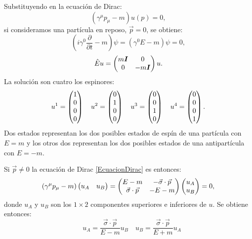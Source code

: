 \documentclass{article}
\theoremstyle{plain}
\theoremstyle{definition}
\begin{document}
	Substituyendo en la ecuación de Dirac:\[
	\left(\gamma^\mu p_{\mu}-m\right)u(p)=0,
	\]
	si consideramos una partícula en reposo, \(\vec{p}=0 \), se obtiene: \[\left(i\gamma^0\frac{\partial}{\partial t}-m\right)\psi=\left(\gamma^0E-m\right)\psi=0,\]
	\[\hat{E}u= \left(\begin{array}{@{}cc@{}}
	m\boldsymbol{I} & 0 \\
	0 & -m\boldsymbol{I}
	\end{array} \right)u \text{.}\]
	La solución son cuatro los espinores: \[
	u^1 =
	\left(\begin{array}{@{}c@{}}
	1 \\
	0 \\
	0 \\
	0
	\end{array} \right)
	\quad
	u^2 =
	\left(\begin{array}{@{}c@{}}
	0 \\
	1 \\
	0 \\
	0
	\end{array} \right)
	\quad
	u^3 =
	\left(\begin{array}{@{}c@{}}
	0 \\
	0 \\
	1 \\
	0
	\end{array} \right)
	\quad
	u^4 =
	\left(\begin{array}{@{}c@{}}
	0 \\
	0 \\
	0 \\
	1
	\end{array} \right)\text{.}
	\] Dos estados representan los dos posibles estados de espín de una partícula con \(E=m\) y los otros dos representan los dos posibles estados de una antipartícula con \(E=-m\).\par
	Si \(\vec{p}\neq 0 \) la ecuación de Dirac \ref{EcuacionDirac} es entonces: \[\left(\gamma^\mu p_\mu-m\right)\left(\begin{array}{@{}cc@{}}
	u_A & u_B
	\end{array} \right)= \left(\begin{array}{@{}cc@{}}
	E-m & -\vec{\sigma}\cdot\vec{p} \\
	\vec{\sigma}\cdot\vec{p} & -E-m
	\end{array} \right)\left(\begin{array}{@{}c@{}}
	u_A \\ u_B
	\end{array} \right) =0 ,\] donde \(u_A\) y \(u_B\) son los \(1 \times 2\) componentes superiores e inferiores de \(u\). Se obtiene entonces: \[
	\quad
	u_A =\frac{\vec{\sigma}\cdot\vec{p}}{E-m}u_B
	\quad
	u_B =\frac{\vec{\sigma}\cdot\vec{p}}{E+m}u_A
	\]
\end{document}
